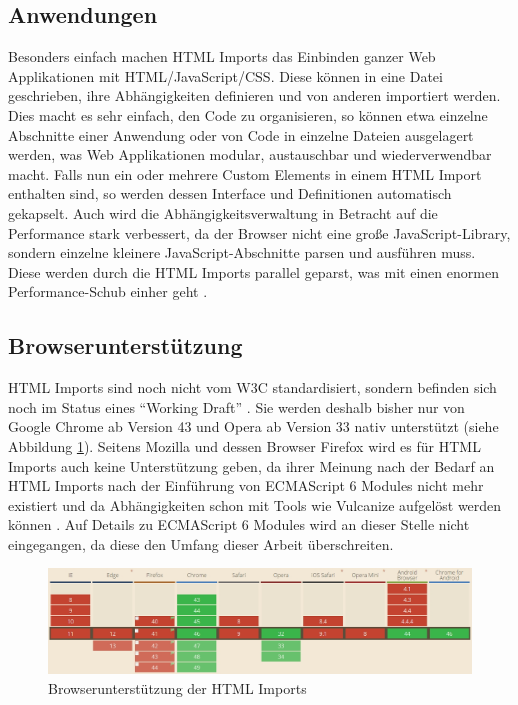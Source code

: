 \subsection{Anwendungen}\label{anwendungen}

Besonders einfach machen \ac{HTML} Imports das Einbinden ganzer Web Applikationen mit \ac{HTML}/JavaScript/\ac{CSS}. Diese können in eine Datei geschrieben, ihre Abhängigkeiten definieren und von anderen importiert werden. Dies macht es sehr einfach, den Code zu organisieren, so können etwa einzelne Abschnitte einer Anwendung oder von Code in einzelne Dateien ausgelagert werden, was Web Applikationen modular, austauschbar und wiederverwendbar macht. Falls nun ein oder mehrere Custom Elements in einem \ac{HTML} Import enthalten sind, so werden dessen Interface und Definitionen automatisch gekapselt. Auch wird die Abhängigkeitsverwaltung in Betracht auf die Performance stark verbessert, da der Browser nicht eine große JavaScript-Library, sondern einzelne kleinere JavaScript-Abschnitte parsen und ausführen muss. Diese werden durch die \ac{HTML} Imports parallel geparst, was mit einen enormen Performance-Schub einher geht \cite{citeulike:13853647}.


\subsection{Browserunterstützung}\label{browserunterstuxfctzung}

\ac{HTML} Imports sind noch nicht vom \ac{W3C} standardisiert, sondern befinden sich noch im Status eines ``Working Draft'' \cite{citeulike:13853711}. Sie werden deshalb bisher nur von Google Chrome ab Version 43 und Opera ab Version 33 nativ unterstützt (siehe Abbildung \ref{fig:bdhtmli}). Seitens Mozilla und dessen Browser Firefox wird es für \ac{HTML} Imports auch keine Unterstützung geben, da ihrer Meinung nach der Bedarf an \ac{HTML} Imports nach der Einführung von ECMAScript 6 Modules nicht mehr existiert und da Abhängigkeiten schon mit Tools wie Vulcanize aufgelöst werden können \cite{citeulike:13881144}. Auf Details zu ECMAScript 6 Modules wird an dieser Stelle nicht eingegangen, da diese den Umfang dieser Arbeit überschreiten.

\begin{figure}[htbp]
 \centering
 \includegraphics[width=\linewidth]{kapitel2/bilder/5-html-imports-browserunterstuetzung}
 \caption{Browserunterstützung der HTML Imports}
 \label{fig:bdhtmli}
\end{figure}
